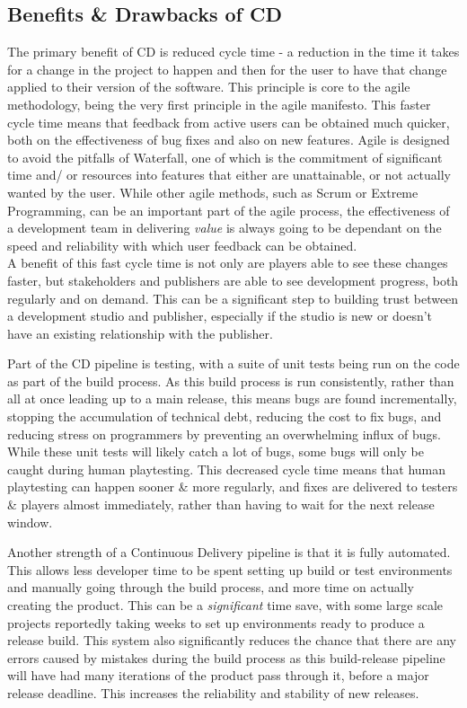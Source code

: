 \documentclass[lettersize,journal]{IEEEtran}
\begin{document}
    \subsection{Benefits \& Drawbacks of CD}
        The primary benefit of CD is reduced cycle time - a reduction in the time it takes for a change in the project to happen and then for the user to have that change applied to their version of the software. This principle is core to the agile methodology, being the very first principle in the agile manifesto\cite{agilemanifesto}. This faster cycle time means that feedback from active users can be obtained much quicker, both on the effectiveness of bug fixes and also on new features. Agile is designed to avoid the pitfalls of Waterfall\cite{royce1987managing}, one of which is the commitment of significant time and/ or resources into features that either are unattainable, or not actually wanted by the user. While other agile methods, such as Scrum or Extreme Programming\cite{cohen2004introduction,agilewithscrum}, can be an important part of the agile process, the effectiveness of a development team in delivering \textit{value} is always going to be dependant on the speed and reliability with which user feedback can be obtained. \\
        A benefit of this fast cycle time is not only are players able to see these changes faster, but stakeholders and publishers are able to see development progress, both regularly and on demand. This can be a significant step to building trust between a development studio and publisher, especially if the studio is new or doesn't have an existing relationship with the publisher\cite{gamedevhandbook}. 

        Part of the CD pipeline is testing, with a suite of unit tests being run on the code as part of the build process. As this build process is run consistently, rather than all at once leading up to a main release, this means bugs are found incrementally, stopping the accumulation of technical debt, reducing the cost to fix bugs, and reducing stress on programmers by preventing an overwhelming influx of bugs. While these unit tests will likely catch a lot of bugs, some bugs will only be caught during human playtesting. This decreased cycle time means that human playtesting can happen sooner \& more regularly, and fixes are delivered to testers \& players almost immediately, rather than having to wait for the next release window.
        
        Another strength of a Continuous Delivery pipeline is that it is fully automated. This allows less developer time to be spent setting up build or test environments and manually going through the build process, and more time on actually creating the product. This can be a \textit{significant} time save, with some large scale projects reportedly taking weeks to set up environments ready to produce a release build\cite{paddy, ContDelIntro}. This system also significantly reduces the chance that there are any errors caused by mistakes during the build process as this build-release pipeline will have had many iterations of the product pass through it, before a major release deadline. This increases the reliability and stability of new releases.
    
\end{document}

